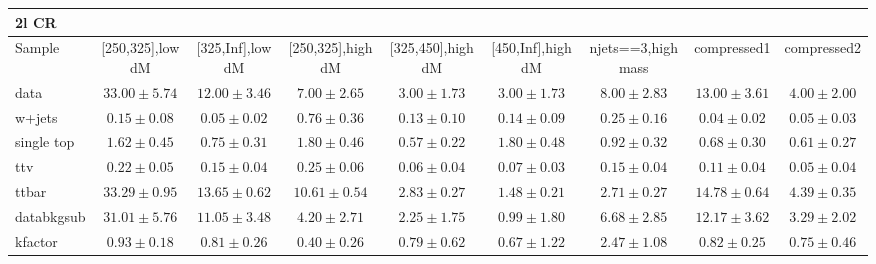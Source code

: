 \begin{table}
\begin{center}
\small
\begin{tabular}{lcccccccc}
\hline
2l CR & & & & & & & &\\
\hline
Sample&[250,325],low dM&[325,Inf],low dM&[250,325],high dM&[325,450],high dM&[450,Inf],high dM&njets==3,high mass&compressed1&compressed2\\
\hline
data&$33.00\pm5.74$&$12.00\pm3.46$&$7.00\pm2.65$&$3.00\pm1.73$&$3.00\pm1.73$&$8.00\pm2.83$&$13.00\pm3.61$&$4.00\pm2.00$\\
\hline
w+jets&$0.15\pm0.08$&$0.05\pm0.02$&$0.76\pm0.36$&$0.13\pm0.10$&$0.14\pm0.09$&$0.25\pm0.16$&$0.04\pm0.02$&$0.05\pm0.03$\\
single top&$1.62\pm0.45$&$0.75\pm0.31$&$1.80\pm0.46$&$0.57\pm0.22$&$1.80\pm0.48$&$0.92\pm0.32$&$0.68\pm0.30$&$0.61\pm0.27$\\
ttv&$0.22\pm0.05$&$0.15\pm0.04$&$0.25\pm0.06$&$0.06\pm0.04$&$0.07\pm0.03$&$0.15\pm0.04$&$0.11\pm0.04$&$0.05\pm0.04$\\
ttbar&$33.29\pm0.95$&$13.65\pm0.62$&$10.61\pm0.54$&$2.83\pm0.27$&$1.48\pm0.21$&$2.71\pm0.27$&$14.78\pm0.64$&$4.39\pm0.35$\\
databkgsub&$31.01\pm5.76$&$11.05\pm3.48$&$4.20\pm2.71$&$2.25\pm1.75$&$0.99\pm1.80$&$6.68\pm2.85$&$12.17\pm3.62$&$3.29\pm2.02$\\
kfactor&$0.93\pm0.18$&$0.81\pm0.26$&$0.40\pm0.26$&$0.79\pm0.62$&$0.67\pm1.22$&$2.47\pm1.08$&$0.82\pm0.25$&$0.75\pm0.46$\\
\hline\hline
\end{tabular}
\end{center}
\end{table}

